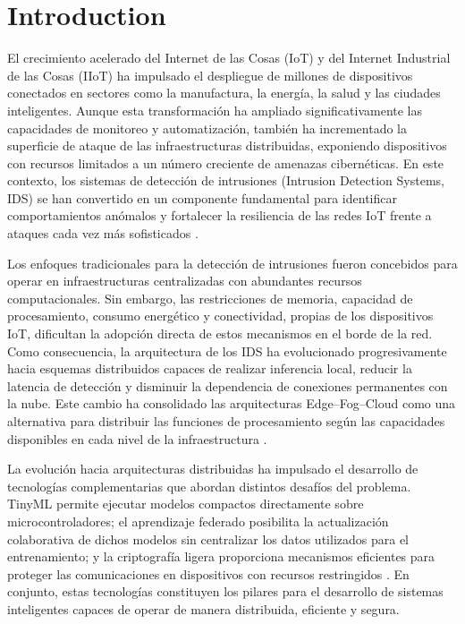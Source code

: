 \documentclass[journal,article,submit,moreauthors]{Definitions/mdpi}
\begin{document}

\section{Introduction}

El crecimiento acelerado del Internet de las Cosas (IoT) y del Internet Industrial de las Cosas (IIoT) ha impulsado el despliegue de millones de dispositivos conectados en sectores como la manufactura, la energía, la salud y las ciudades inteligentes. Aunque esta transformación ha ampliado significativamente las capacidades de monitoreo y automatización, también ha incrementado la superficie de ataque de las infraestructuras distribuidas, exponiendo dispositivos con recursos limitados a un número creciente de amenazas cibernéticas. En este contexto, los sistemas de detección de intrusiones (Intrusion Detection Systems, IDS) se han convertido en un componente fundamental para identificar comportamientos anómalos y fortalecer la resiliencia de las redes IoT frente a ataques cada vez más sofisticados \cite{Ni2024,Amanullah2020,Bagaa2020}.
%

Los enfoques tradicionales para la detección de intrusiones fueron concebidos para operar en infraestructuras centralizadas con abundantes recursos computacionales. Sin embargo, las restricciones de memoria, capacidad de procesamiento, consumo energético y conectividad, propias de los dispositivos IoT, dificultan la adopción directa de estos mecanismos en el borde de la red. Como consecuencia, la arquitectura de los IDS ha evolucionado progresivamente hacia esquemas distribuidos capaces de realizar inferencia local, reducir la latencia de detección y disminuir la dependencia de conexiones permanentes con la nube. Este cambio ha consolidado las arquitecturas Edge--Fog--Cloud como una alternativa para distribuir las funciones de procesamiento según las capacidades disponibles en cada nivel de la infraestructura \cite{SaravanaBalaji2023,Ni2024,Dini2024}.
%

La evolución hacia arquitecturas distribuidas ha impulsado el desarrollo de tecnologías complementarias que abordan distintos desafíos del problema. TinyML permite ejecutar modelos compactos directamente sobre microcontroladores; el aprendizaje federado posibilita la actualización colaborativa de dichos modelos sin centralizar los datos utilizados para el entrenamiento; y la criptografía ligera proporciona mecanismos eficientes para proteger las comunicaciones en dispositivos con recursos restringidos \cite{Tekin2023,Amuthadevi2025,McMahan2017,Imteaj2022,NIST800232,Kaur2025}. En conjunto, estas tecnologías constituyen los pilares para el desarrollo de sistemas inteligentes capaces de operar de manera distribuida, eficiente y segura.
\end{document}
